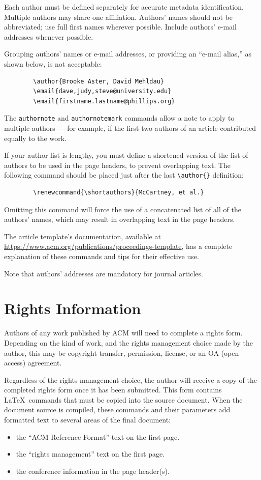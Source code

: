 \documentclass[sigconf]{acmart}
\begin{document}
	Each author must be defined separately for accurate metadata
	identification. Multiple authors may share one affiliation. Authors'
	names should not be abbreviated; use full first names wherever
	possible. Include authors' e-mail addresses whenever possible.
	
	Grouping authors' names or e-mail addresses, or providing an ``e-mail
	alias,'' as shown below, is not acceptable:
	\begin{verbatim}
		\author{Brooke Aster, David Mehldau}
		\email{dave,judy,steve@university.edu}
		\email{firstname.lastname@phillips.org}
	\end{verbatim}
	
	The \verb|authornote| and \verb|authornotemark| commands allow a note
	to apply to multiple authors --- for example, if the first two authors
	of an article contributed equally to the work.
	
	If your author list is lengthy, you must define a shortened version of
	the list of authors to be used in the page headers, to prevent
	overlapping text. The following command should be placed just after
	the last \verb|\author{}| definition:
	\begin{verbatim}
		\renewcommand{\shortauthors}{McCartney, et al.}
	\end{verbatim}
	Omitting this command will force the use of a concatenated list of all
	of the authors' names, which may result in overlapping text in the
	page headers.
	
	The article template's documentation, available at
	\url{https://www.acm.org/publications/proceedings-template}, has a
	complete explanation of these commands and tips for their effective
	use.
	
	Note that authors' addresses are mandatory for journal articles.
	
	\section{Rights Information}
	
	Authors of any work published by ACM will need to complete a rights
	form. Depending on the kind of work, and the rights management choice
	made by the author, this may be copyright transfer, permission,
	license, or an OA (open access) agreement.
	
	Regardless of the rights management choice, the author will receive a
	copy of the completed rights form once it has been submitted. This
	form contains \LaTeX\ commands that must be copied into the source
	document. When the document source is compiled, these commands and
	their parameters add formatted text to several areas of the final
	document:
	\begin{itemize}
		\item the ``ACM Reference Format'' text on the first page.
		\item the ``rights management'' text on the first page.
		\item the conference information in the page header(s).
	\end{itemize}
	
\end{document}
